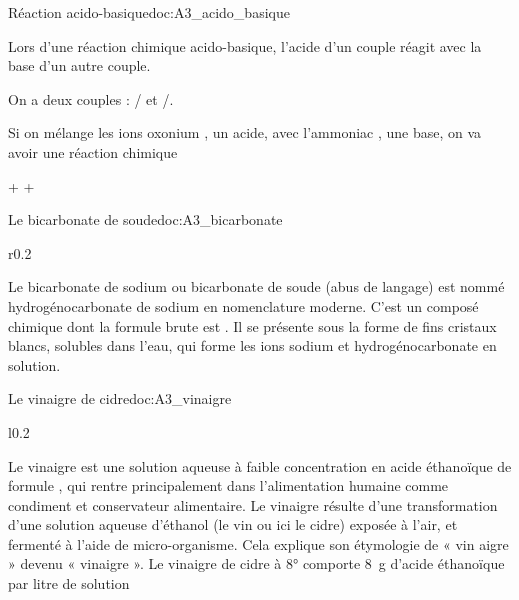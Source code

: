 
\begin{doc}{Réaction acido-basique}{doc:A3_acido_basique}
  \begin{importants}  
    Lors d'une réaction chimique acido-basique, l'acide d'un couple réagit avec la base d'un autre couple.
  \end{importants}
  
  \exemple On a deux couples : / et /.

  Si on mélange les ions oxonium , un acide, avec l'ammoniac , une base, on va avoir une réaction chimique
  \vspace*{-12pt}
  \begin{center}
     +  \reaction {} + 
  \end{center}
\end{doc}


\newpage
\vspace*{-40pt}

\begin{doc}{Le bicarbonate de soude}{doc:A3_bicarbonate}
  \begin{wrapfigure}{r}{0.2\linewidth}
    \vspace*{-38pt}
    \centering
  \end{wrapfigure}
  Le bicarbonate de sodium ou bicarbonate de soude (abus de langage) est nommé hydrogénocarbonate de sodium en nomenclature moderne.
  C’est un composé chimique dont la formule brute est .
  Il se présente sous la forme de fins cristaux blancs, solubles dans l’eau, qui forme les ions sodium  et hydrogénocarbonate  en solution.
\end{doc}

\begin{doc}{Le vinaigre de cidre}{doc:A3_vinaigre}
  \begin{wrapfigure}{l}{0.2\linewidth}
    \vspace*{-22pt}
    \centering
  \end{wrapfigure}
  Le vinaigre est une solution aqueuse à faible concentration en acide éthanoïque de
  formule , qui rentre principalement dans l'alimentation humaine comme condiment et conservateur alimentaire. 
  Le vinaigre résulte d'une transformation d'une solution aqueuse d'éthanol (le vin ou ici le cidre) exposée à l'air, et fermenté à l’aide de micro-organisme.
  Cela explique son étymologie de « vin aigre » devenu « vinaigre ».
  Le vinaigre de cidre à 8° comporte \qty{8}{\g} d’acide éthanoïque par litre de solution
\end{doc}


